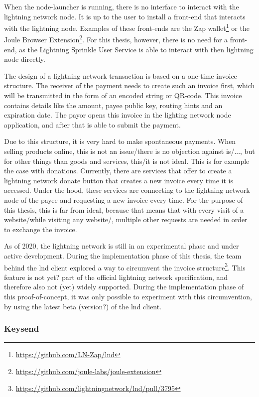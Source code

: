 When the node-launcher is running, there is no interface to interact with the lightning network node. It is up to the user to install a front-end that interacts with the lightning node. Examples of these front-ends are the Zap wallet\footnote{\url{https://github.com/LN-Zap/lnd}} or the Joule Browser Extension\footnote{\url{https://github.com/joule-labs/joule-extension}}. For this thesis, however, there is no need for a front-end, as the Lightning Sprinkle User Service is able to interact with then lightning node directly. 

The design of a lightning network transaction is based on a one-time invoice structure. The receiver of the payment needs to create such an invoice first, which will be transmitted in the form of an encoded string or QR-code. This invoice contains details like the amount, payee public key, routing hints and an expiration date. The payor opens this invoice in the lighting network node application, and after that is able to submit the payment.

Due to this structure, it is very hard to make spontaneous payments. When selling products online, this is not an issue/there is no objection against is/..., but for other things than goods and services, this/it is not ideal. This is for example the case with donations. Currently, there are services that offer to create a lightning network donate button that creates a new invoice every time it is accessed. Under the hood, these services are connecting to the lightning network node of the payee and requesting a new invoice every time. For the purpose of this thesis, this is far from ideal, because that means that with every visit of a website/while visiting any website/, multiple other requests are needed in order to exchange the invoice. 

As of 2020, the lightning network is still in an experimental phase and under active development. During the implementation phase of this thesis, the team behind the lnd client explored a way to circumvent the invoice structure\footnote{\url{https://github.com/lightningnetwork/lnd/pull/3795}}. This feature is not yet? part of the official lightning network specification, and therefore also not (yet) widely supported. During the implementation phase of this proof-of-concept, it was only possible to experiment with this circumvention, by using the latest beta (version?) of the lnd client. 

\subsubsection{Keysend}
\label{sec:keysend}

